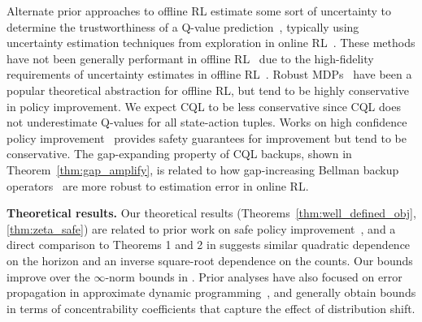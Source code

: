 Alternate prior approaches to offline RL estimate some sort of uncertainty to determine the trustworthiness of a Q-value prediction~\citep{kumar2019stabilizing,agarwal2019optimistic,levine2020offline}, typically using uncertainty estimation techniques from exploration in online RL~\citep{osband2016deep,jaksch2010near,osband2017posterior,burda2018exploration}. These methods have not been generally performant in offline RL~\citep{fujimoto2018off,kumar2019stabilizing,levine2020offline} due to the high-fidelity requirements of uncertainty estimates in offline RL~\citep{levine2020offline}. Robust MDPs~\citep{iyengar2005robust,ghavamzadeh2016safe,tamar2014scaling,nilim2004robustness} have been a popular theoretical abstraction for offline RL, but tend to be highly conservative in policy improvement. We expect CQL to be less conservative since CQL does not underestimate Q-values for all state-action tuples. Works on high confidence policy improvement~\citep{thomas2015high} provides safety guarantees for improvement but tend to be conservative.   
The gap-expanding property of CQL backups, shown in Theorem~\ref{thm:gap_amplify}, is related to how gap-increasing Bellman backup operators~\citep{bellemare2016increasing,lu2018general} are more robust to estimation error in online RL. 

\textbf{Theoretical results.} 
Our theoretical results (Theorems~\ref{thm:well_defined_obj}, \ref{thm:zeta_safe}) are related to prior work on safe policy improvement~\citep{laroche2017safe,ghavamzadeh2016safe}, and a direct comparison to Theorems 1 and 2 in \citet{laroche2017safe} suggests similar quadratic dependence on the horizon and an inverse square-root dependence on the counts. Our bounds improve over the $\infty$-norm bounds in \citet{ghavamzadeh2016safe}. Prior analyses have also focused on error propagation in approximate dynamic programming~\citep{farahmand2010error,chen2019information,xie2020q,scherrer2014approximate,kumar2019stabilizing}, and generally obtain bounds in terms of concentrability coefficients that capture the effect of distribution shift.




